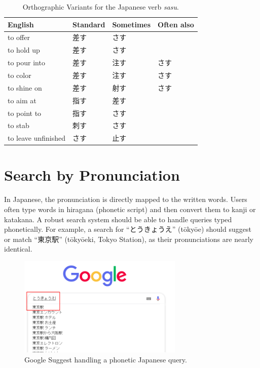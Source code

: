 \documentclass[11pt]{article}
\begin{document}
\begin{table}[h!]
    \centering
    \caption{Orthographic Variants for the Japanese verb \textit{sasu}.}
    \begin{tabular}{llll}
    \toprule
    \textbf{English} & \textbf{Standard} & \textbf{Sometimes} & \textbf{Often also} \\
    \midrule
    to offer & 差す & さす & \\
    to hold up & 差す & さす & \\
    to pour into & 差す & 注す & さす \\
    to color & 差す & 注す & さす \\
    to shine on & 差す & 射す & さす \\
    to aim at & 指す & 差す & \\
    to point to & 指す & さす & \\
    to stab & 刺す & さす & \\
    to leave unfinished & さす & 止す & \\
    \bottomrule
    \end{tabular}
\end{table}

\section{Search by Pronunciation}
In Japanese, the pronunciation is directly mapped to the written words. Users often type words in hiragana (phonetic script) and then convert them to kanji or katakana. A robust search system should be able to handle queries typed phonetically. For example, a search for “とうきょうえ” (tōkyōe) should suggest or match “東京駅” (tōkyōeki, Tokyo Station), as their pronunciations are nearly identical.

\begin{figure}[h!]
    \centering
    \includegraphics[width=0.7\textwidth]{image8.png}
    \caption{Google Suggest handling a phonetic Japanese query.}
    \label{fig:google_suggest_pronunciation}
\end{figure}
\end{document}
